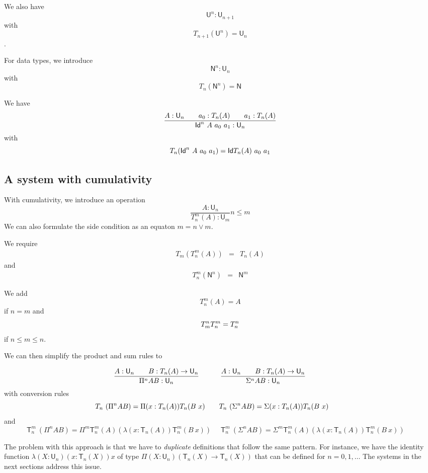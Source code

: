 \documentclass[10pt,a4paper]{article}
\newcommand{\Id}{\mathsf{Id}}
\def\NN{\mathsf{N}}
\def\UU{\mathsf{U}}
\newcommand{\T}{\mathsf{T}}
\begin{document}
We also have $${\UU^{n}}:\UU_{n + 1}$$ with
$$T_{n + 1}({\UU^{n}}) = \UU_{n}$$.

For data types, we introduce $$\NN^{n}:\UU_{n}$$ with
$$T_{n}(\NN^{n}) = \NN$$

We have 
$$
\frac{A:\UU_n~~~~~~a_0:\\T_n(A)~~~~~~a_1:\\T_n(A)}
{\Id^n~A~a_0~a_1:\UU_n}
$$ 
with $$\\T_n(\Id^n~A~a_0~a_1) = \Id~\\T_n(A)~a_0~a_1$$

\subsection*{A system with cumulativity}

With cumulativity, we introduce an operation 
$$
\frac{A:\UU_{n}}
{T_{n}^{m}(A):\UU_{m}}
n\leqslant m
$$
We can also formulate the side condition as an equaton $m = n \vee m$.

We require
\begin{eqnarray*}
T_m(T_{n}^{m}(A)) &=& T_{n}(A)
\end{eqnarray*}
and
\begin{eqnarray*}
T_{n}^{m}(\NN^{n}) &=& \NN^{m}
\end{eqnarray*}

We add $$
T_{n}^m(A) = A
$$
if $n = m$
and $$T_{m}^n\\T_{n}^m = T_n^n$$ if $n\leqslant m\leqslant n$.

We can then simplify the product and sum rules to

$$
\frac{A:\UU_{n}~~~~~~B:\\T_{n}(A)\rightarrow \UU_{n}}
     {\Pi^{n} A B:\UU_{n}}~~~~~~~~~
\frac{A:\UU_{n}~~~~~~B:\\T_{n}(A)\rightarrow \UU_{n}}
     {\Sigma^{n} A B:\UU_{n}}~~~~~~~~~
$$
with conversion rules
$$
\\T_{n}~(\Pi^{n} A B) = \Pi (x:\\T_{n}(A)) \\T_{n}(B~x)~~~~~~~
\\T_{n}~(\Sigma^{n} A B) = \Sigma (x:\\T_{n}(A)) \\T_{n}(B~x)~~~~~~~
$$
and
$$
\T_{n}^{m}~(\Pi^{n} A B) = \Pi^{m} \T_{n}^{m}(A) (\lambda (x:\T_{n}(A))\T_{n}^{m}(B~x))~~~~~~
\T_{n}^{m}~(\Sigma^{n} A B) = \Sigma^{m} \T_{n}^{m}(A) (\lambda (x:\T_{n}(A))\T_{n}^{m}(B~x))~~~~~~
$$

The problem with this approach is that we have to {\em duplicate} definitions that follow
the same pattern. For instance, we have the identity function $\lambda (X:\UU_n)(x:\T_n(X))x$
of type $\Pi (X:\UU_n)(\T_n(X)\rightarrow \T_n(X))$ that can be defined for $n = 0,1,\dots$
The systems in the next sections address this issue.
\end{document}
